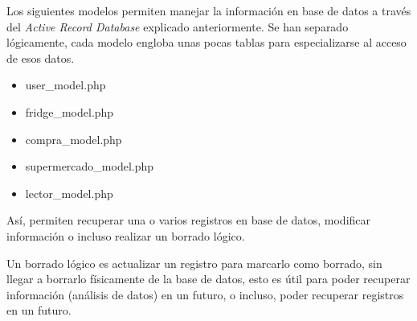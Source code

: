         Los siguientes modelos permiten manejar la información en base de datos a través del \emph{Active Record Database} explicado anteriormente. Se han separado lógicamente, cada modelo engloba unas pocas tablas para especializarse al acceso de esos datos.

        \begin{itemize}
            \item user\_model.php
            \item fridge\_model.php
            \item compra\_model.php
            \item supermercado\_model.php
            \item lector\_model.php
        \end{itemize}

        Así, permiten recuperar una o varios registros en base de datos, modificar información o incluso realizar un borrado lógico.

        Un borrado lógico es actualizar un registro para marcarlo como borrado, sin llegar a borrarlo físicamente de la base de datos, esto es útil para poder recuperar información (análisis de datos) en un futuro, o incluso, poder recuperar registros en un futuro.
